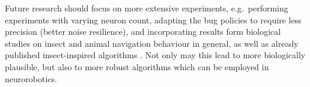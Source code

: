 \documentclass[letterpaper,10pt,conference]{ieeeconf}
\begin{document}
Future research should focus on more extensive experiments, e.g.~performing experiments with varying neuron count, adapting the bug policies to require less precision (better noise resilience), and incorporating results form biological studies on insect and animal navigation behaviour in general, as well as already published insect-inspired algorithms \cite{moller2012model}. Not only may this lead to more biologically plausible, but also to more robust algorithms which can be employed in neurorobotics.



\printbibliography
\end{document}

